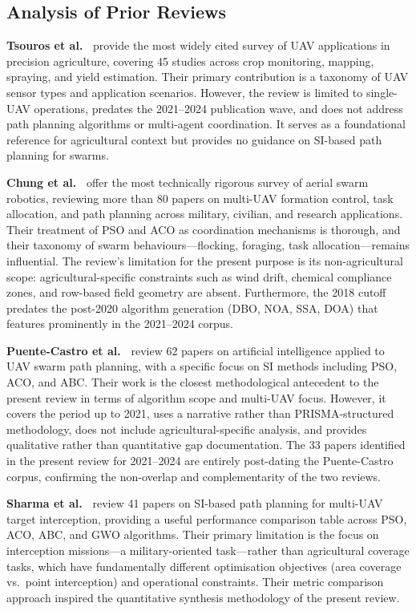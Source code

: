 \documentclass[review,3p,times]{elsarticle}
\begin{document}
\subsection*{Analysis of Prior Reviews}

\textbf{Tsouros et al.\ \cite{tsouros2019}} provide the most widely cited survey of UAV applications in precision agriculture, covering 45 studies across crop monitoring, mapping, spraying, and yield estimation. Their primary contribution is a taxonomy of UAV sensor types and application scenarios. However, the review is limited to single-UAV operations, predates the 2021--2024 publication wave, and does not address path planning algorithms or multi-agent coordination. It serves as a foundational reference for agricultural context but provides no guidance on SI-based path planning for swarms.

\textbf{Chung et al.\ \cite{chung2018}} offer the most technically rigorous survey of aerial swarm robotics, reviewing more than 80 papers on multi-UAV formation control, task allocation, and path planning across military, civilian, and research applications. Their treatment of PSO and ACO as coordination mechanisms is thorough, and their taxonomy of swarm behaviours---flocking, foraging, task allocation---remains influential. The review's limitation for the present purpose is its non-agricultural scope: agricultural-specific constraints such as wind drift, chemical compliance zones, and row-based field geometry are absent. Furthermore, the 2018 cutoff predates the post-2020 algorithm generation (DBO, NOA, SSA, DOA) that features prominently in the 2021--2024 corpus.

\textbf{Puente-Castro et al.\ \cite{puente2022}} review 62 papers on artificial intelligence applied to UAV swarm path planning, with a specific focus on SI methods including PSO, ACO, and ABC. Their work is the closest methodological antecedent to the present review in terms of algorithm scope and multi-UAV focus. However, it covers the period up to 2021, uses a narrative rather than PRISMA-structured methodology, does not include agricultural-specific analysis, and provides qualitative rather than quantitative gap documentation. The 33 papers identified in the present review for 2021--2024 are entirely post-dating the Puente-Castro corpus, confirming the non-overlap and complementarity of the two reviews.

\textbf{Sharma et al.\ \cite{sharma2022}} review 41 papers on SI-based path planning for multi-UAV target interception, providing a useful performance comparison table across PSO, ACO, ABC, and GWO algorithms. Their primary limitation is the focus on interception missions---a military-oriented task---rather than agricultural coverage tasks, which have fundamentally different optimisation objectives (area coverage vs.\ point interception) and operational constraints. Their metric comparison approach inspired the quantitative synthesis methodology of the present review.
\end{document}
